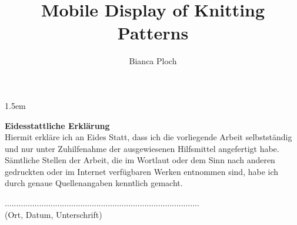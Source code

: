 \author{Bianca Ploch}
\title{Mobile Display of Knitting Patterns}




\makeglossaries











\newpage
\printglossary[type=\acronymtype,title={Abbreviations}]

\newpage 
\sloppy %
\emergencystretch 1.5em %
\listoffigures

\newpage
\lstlistoflistings

\printbibliography

\begin{appendix}
   \clearpage
   
\end{appendix}

\newpage
\thispagestyle{empty}

\noindent \textbf{Eidesstattliche Erklärung}\\

\noindent Hiermit erkläre ich an Eides Statt, dass ich die vorliegende Arbeit selbstständig und nur unter
Zuhilfenahme der ausgewiesenen Hilfsmittel angefertigt habe.
Sämtliche Stellen der Arbeit, die im Wortlaut oder dem Sinn nach anderen gedruckten oder
im Internet verfügbaren Werken entnommen sind, habe ich durch genaue Quellenangaben
kenntlich gemacht.

\vspace*{1.5cm}
\noindent .....................................................................................\\
(Ort, Datum, Unterschrift)

